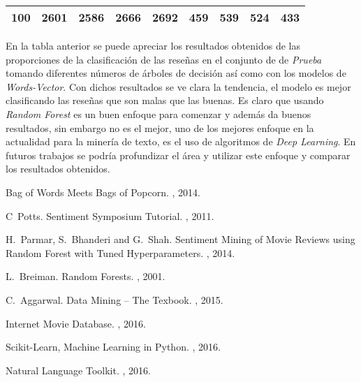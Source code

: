 \documentclass{sciposter}
\begin{document}
\begin{multicols}{3}
\begin{table}[h]
\begin{tabular}{ |c|c|c|c|c|c|c|c|c| }
100& 2601 & 2586 & 2666 & 2692 & 459 & 539 & 524 & 433 \\
\hline
\end{tabular}
\end{table}

En la tabla anterior se puede apreciar los resultados obtenidos de las proporciones de la clasificaci\'on de las reseñas en el conjunto de de \emph{Prueba} tomando diferentes n\'umeros de \'arboles de decisi\'on as\'i como con los modelos de \emph{Words-Vector}. Con dichos resultados se ve clara la tendencia, el modelo es mejor clasificando las reseñas que son malas que las buenas. Es claro que usando \emph{Random Forest} es un buen enfoque para comenzar y adem\'as da buenos resultados, sin embargo no es el mejor, uno de los mejores enfoque en la actualidad para la miner\'ia de texto, es el uso de algoritmos de \emph{Deep Learning}. En futuros trabajos se podr\'ia profundizar el \'area y utilizar este enfoque y comparar los resultados obtenidos.

\begin{thebibliography}{1}

\newblock Bag of Words Meets Bags of Popcorn.
, 2014.

 C~Potts.
\newblock Sentiment Symposium Tutorial.
, 2011.

 H.~Parmar, S.~Bhanderi and G.~Shah.
\newblock Sentiment Mining of Movie Reviews using Random Forest with Tuned Hyperparameters.
, 2014.

 L.~Breiman.
\newblock Random Forests.
, 2001.

 C.~Aggarwal.
\newblock Data Mining -- The Texbook.
, 2015.

\newblock Internet Movie Database.
, 2016.

\newblock Scikit-Learn, Machine Learning in Python.
, 2016.

\newblock Natural Language Toolkit.
, 2016.

\end{thebibliography}

\end{multicols}
\end{document}
